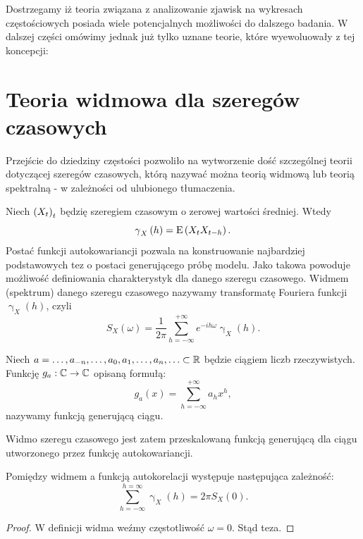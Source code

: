 \documentclass[10pt,a4paper]{book}
\newcommand{\tsAutoCovariance}[3][\gamma]{\operatorname{#1}_{#2} \left({#3}\right)}
\begin{document}
Dostrzegamy iż teoria związana z analizowanie zjawisk na wykresach częstościowych posiada wiele potencjalnych możliwości do dalszego badania. W dalszej części omówimy jednak już tylko uznane teorie, które wyewoluowały z tej koncepcji:

\section{Teoria widmowa dla szeregów czasowych}

Przejście do dziedziny częstości pozwoliło na wytworzenie dość szczególnej teorii dotyczącej szeregów czasowych, którą nazywać można teorią widmową lub teorią spektralną - w zależności od ulubionego tłumaczenia.

\begin{definition}
Niech $\left({X_t}\right)_{t}$ będzię szeregiem czasowym o zerowej wartości średniej. Wtedy
$$
\tsAutoCovariance{X}{h} = \Ex{X_t X_{t-h}}.
$$
Postać funkcji autokowariancji pozwala na konstruowanie najbardziej podstawowych tez o postaci generującego próbę modelu. Jako takowa powoduje możliwość definiowania charakterystyk dla danego szeregu czasowego. Widmem (spektrum) danego szeregu czasowego nazywamy transformatę Fouriera funkcji $\tsAutoCovariance{X}{h}$, czyli
$$
S_X(\omega) = \frac{1}{2\pi} \sum_{h=-\infty}^{+\infty} e^{-ih\omega} \tsAutoCovariance{X}{h}.
$$
\end{definition}

\begin{definition}
Niech $a = \ldots, a_{-n}, \ldots, a_0, a_1, \ldots, a_n, \ldots \subset \mathbb{R} $ będzie ciągiem liczb rzeczywistych. Funkcję $g_a : \mathbb{C} \to \mathbb{C}$ opisaną formułą:
$$
g_a(x) = \sum_{h= -\infty}^{+\infty} a_h x^{h},
$$
nazywamy funkcją generującą ciągu.
\end{definition}

\begin{remark*}
Widmo szeregu czasowego jest zatem przeskalowaną funkcją generującą dla ciągu utworzonego przez funkcję autokowariancji. 
\end{remark*}

\begin{corollary}[]
Pomiędzy widmem a funkcją autokorelacji występuje następująca zależność:
$$
\sum_{h=-\infty}^{h=\infty} \tsAutoCovariance{X}{h} = 2\pi S_X(0).
$$
\end{corollary}

\begin{proof}
W definicji widma weźmy częstotliwość $\omega = 0$. Stąd teza.
\end{proof}
\end{document}
